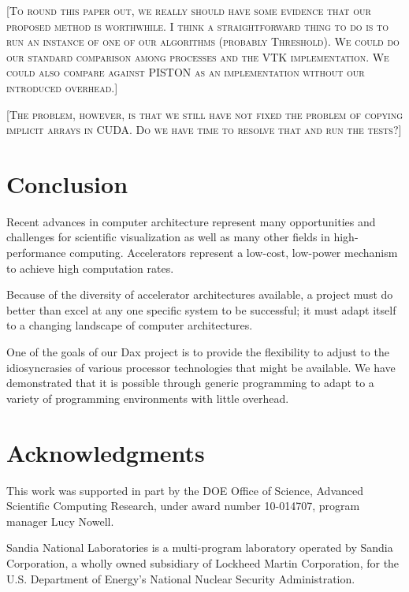 \documentclass[conference]{IEEEtran}
\newcommand{\fix}[1]{{\color{red}\textsc{[#1]}}}
\begin{document}
\noindent
\fix{To round this paper out, we really should have some evidence that our
  proposed method is worthwhile.  I think a straightforward thing to do is
  to run an instance of one of our algorithms (probably Threshold).  We
  could do our standard comparison among processes and the VTK
  implementation.  We could also compare against PISTON as an
  implementation without our introduced overhead.}

\fix{The problem, however, is that we still have not fixed the problem of
  copying implicit arrays in CUDA.  Do we have time to resolve that and run
  the tests?}

\section{Conclusion}
\label{sec:Conclusion}

\noindent
Recent advances in computer architecture represent many opportunities and
challenges for scientific visualization as well as many other fields in
high-performance computing.  Accelerators represent a low-cost, low-power
mechanism to achieve high computation rates.

Because of the diversity of accelerator architectures available, a project
must do better than excel at any one specific system to be successful; it
must adapt itself to a changing landscape of computer architectures.

One of the goals of our Dax project is to provide the flexibility to adjust
to the idiosyncrasies of various processor technologies that might be
available.  We have demonstrated that it is possible through generic
programming to adapt to a variety of programming environments with little
overhead.

\section*{Acknowledgments}

\noindent
This work was supported in part by the DOE Office of Science, Advanced
Scientific Computing Research, under award number 10-014707, program
manager Lucy Nowell.

Sandia National Laboratories is a multi-program laboratory operated by
Sandia Corporation, a wholly owned subsidiary of Lockheed Martin
Corporation, for the U.S. Department of Energy's National Nuclear Security
Administration.



\end{document}
